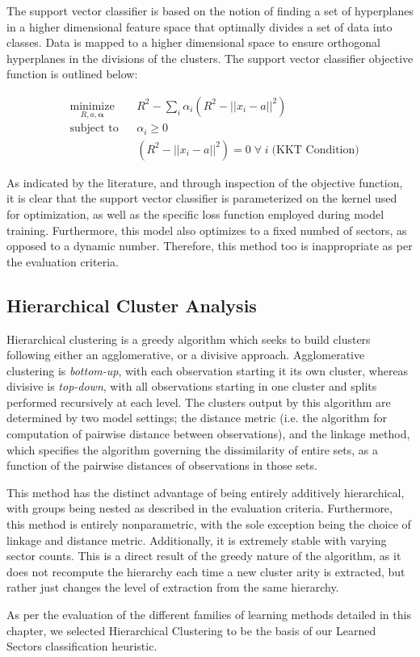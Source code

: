 \documentclass[../main.tex]{subfiles}
\begin{document}
The support vector classifier is based on the notion of finding a set of hyperplanes in a higher dimensional feature space that optimally divides a set of data into classes. Data is mapped to a higher dimensional space to ensure orthogonal hyperplanes in the divisions of the clusters. The support vector classifier objective function is outlined below:

\begin{equation*}
    \begin{aligned}
        & \underset{R, a, \boldsymbol{\alpha}}{\text{minimize}} & & R^2 - \sum_i \alpha_i (R^2 - ||x_i - a||^2) \\
        & \text{subject to}
        & & \alpha_i \geq 0 \\
        & & & (R^2 - ||x_i - a||^2) = 0 \; \forall \; i \; \text{(KKT Condition)}
    \end{aligned}
\end{equation*}

As indicated by the literature, and through inspection of the objective function, it is clear that the support vector classifier is parameterized on the kernel used for optimization, as well as the specific loss function employed during model training. Furthermore, this model also optimizes to a fixed numbed of sectors, as opposed to a dynamic number. Therefore, this method too is inappropriate as per the evaluation criteria.

\subsection{Hierarchical Cluster Analysis} \label{learning_methods_survey:hca}

Hierarchical clustering is a greedy algorithm which seeks to build clusters following either an agglomerative, or a divisive approach. Agglomerative clustering is \textit{bottom-up}, with each observation starting it its own cluster, whereas divisive is \textit{top-down}, with all observations starting in one cluster and splits performed recursively at each level. The clusters output by this algorithm are determined by two model settings; the distance metric (i.e. the algorithm for computation of pairwise distance between observations), and the linkage method, which specifies the algorithm governing the dissimilarity of entire sets, as a function of the pairwise distances of observations in those sets.

This method has the distinct advantage of being entirely additively hierarchical, with groups being nested as described in the evaluation criteria. Furthermore, this method is entirely nonparametric, with the sole exception being the choice of linkage and distance metric. Additionally, it is extremely stable with varying sector counts. This is a direct result of the greedy nature of the algorithm, as it does not recompute the hierarchy each time a new cluster arity is extracted, but rather just changes the level of extraction from the same hierarchy.

As per the evaluation of the different families of learning methods detailed in this chapter, we selected Hierarchical Clustering to be the basis of our Learned Sectors classification heuristic.
\end{document}
